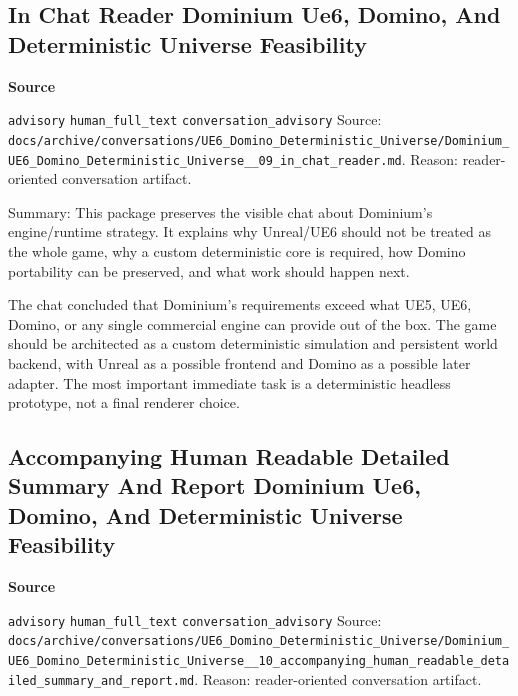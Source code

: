 \documentclass[9pt,a4paper,openany]{book}
\newcommand{\vonecallout}[3]{\par\medskip\noindent\begingroup\setlength{\fboxsep}{7pt}\colorbox{DomCalloutBg}{\parbox{0.94\linewidth}{\textbf{\textcolor{#1}{#2}}\par #3}}\endgroup\par\medskip}
\begin{document}
\subsection{In Chat Reader Dominium Ue6, Domino, And Deterministic Universe Feasibility}

\vonecallout{DomSlate}{Source}{\texttt{advisory} \texttt{human\_\allowbreak{}full\_\allowbreak{}text} \texttt{conversation\_\allowbreak{}advisory} Source: \texttt{docs/\allowbreak{}archive/\allowbreak{}conversations/\allowbreak{}UE6\_\allowbreak{}Domino\_\allowbreak{}Deterministic\_\allowbreak{}Universe/\allowbreak{}Dominium\_\allowbreak{}UE6\_\allowbreak{}Domino\_\allowbreak{}Deterministic\_\allowbreak{}Universe\_\allowbreak{}\_\allowbreak{}09\_\allowbreak{}in\_\allowbreak{}chat\_\allowbreak{}reader.\allowbreak{}md}.\allowbreak{} Reason: reader-\allowbreak{}oriented conversation artifact.\allowbreak{}}

Summary: This package preserves the visible chat about Dominium's engine/\allowbreak{}runtime strategy.\allowbreak{} It explains why Unreal/\allowbreak{}UE6 should not be treated as the whole game, why a custom deterministic core is required, how Domino portability can be preserved, and what work should happen next.\allowbreak{}


The chat concluded that Dominium's requirements exceed what UE5, UE6, Domino, or any single commercial engine can provide out of the box.\allowbreak{} The game should be architected as a custom deterministic simulation and persistent world backend, with Unreal as a possible frontend and Domino as a possible later adapter.\allowbreak{} The most important immediate task is a deterministic headless prototype, not a final renderer choice.\allowbreak{}



\subsection{Accompanying Human Readable Detailed Summary And Report Dominium Ue6, Domino, And Deterministic Universe Feasibility}

\vonecallout{DomSlate}{Source}{\texttt{advisory} \texttt{human\_\allowbreak{}full\_\allowbreak{}text} \texttt{conversation\_\allowbreak{}advisory} Source: \texttt{docs/\allowbreak{}archive/\allowbreak{}conversations/\allowbreak{}UE6\_\allowbreak{}Domino\_\allowbreak{}Deterministic\_\allowbreak{}Universe/\allowbreak{}Dominium\_\allowbreak{}UE6\_\allowbreak{}Domino\_\allowbreak{}Deterministic\_\allowbreak{}Universe\_\allowbreak{}\_\allowbreak{}10\_\allowbreak{}accompanying\_\allowbreak{}human\_\allowbreak{}readable\_\allowbreak{}detailed\_\allowbreak{}summary\_\allowbreak{}and\_\allowbreak{}report.\allowbreak{}md}.\allowbreak{} Reason: reader-\allowbreak{}oriented conversation artifact.\allowbreak{}}
\end{document}
